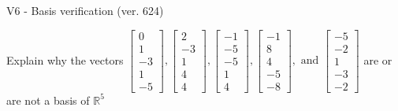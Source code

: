 \begin{exercise}
  \begin{exerciseTitle}V6 - Basis verification (ver. 624)\end{exerciseTitle}
  \begin{exerciseStatement}
    Explain why the vectors \(\left[\begin{array}{r}
0 \\
1 \\
-3 \\
1 \\
-5
\end{array}\right] , \left[\begin{array}{r}
2 \\
-3 \\
1 \\
4 \\
4
\end{array}\right] , \left[\begin{array}{r}
-1 \\
-5 \\
-5 \\
1 \\
4
\end{array}\right] , \left[\begin{array}{r}
-1 \\
8 \\
4 \\
-5 \\
-8
\end{array}\right] , \text{ and } \left[\begin{array}{r}
-5 \\
-2 \\
1 \\
-3 \\
-2
\end{array}\right]\) are or are not a basis of \(\mathbb{R}^5\)	



\end{exerciseStatement}
\end{exercise}
